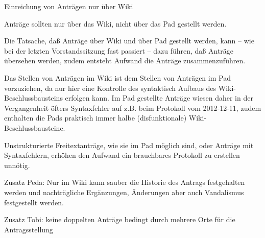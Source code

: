 \documentclass{protokoll}
\begin{document}
\begin{Antrag}
        {Einreichung von Anträgen nur über Wiki}
        {\angenommen}


\begin{Text}
Anträge sollten nur über das Wiki, nicht über das Pad gestellt werden.
\end{Text}

\begin{Begründung}
Die Tatsache, daß Anträge über Wiki und über Pad gestellt werden, kann
– wie bei der letzten Vorstandssitzung fast passiert – dazu führen,
daß Anträge übersehen werden, zudem entsteht Aufwand die Anträge
zusammenzuführen.

Das Stellen von Anträgen im Wiki ist dem Stellen von Anträgen im Pad
vorzuziehen, da nur hier eine Kontrolle des syntaktisch Aufbaus des
Wiki-Beschlussbausteins erfolgen kann. Im Pad gestellte Anträge wiesen
daher in der Vergangenheit öfters Syntaxfehler auf z.B. beim Protokoll
vom 2012-12-11, zudem enthalten die Pads praktisch immer halbe
(disfunktionale) Wiki-Beschlussbausteine.

Unstrukturierte Freitextanträge, wie sie im Pad möglich sind, oder
Anträge mit Syntaxfehlern, erhöhen den Aufwand ein brauchbares
Protokoll zu erstellen unnötig.

Zusatz Peda: Nur im Wiki kann sauber die Historie des Antrags
festgehalten werden und nachträgliche Ergänzungen, Änderungen aber
auch Vandalismus festgestellt werden.

Zusatz Tobi: keine doppelten Anträge bedingt durch mehrere Orte für
die Antragsstellung
\end{Begründung}


\end{Antrag}
\end{document}

